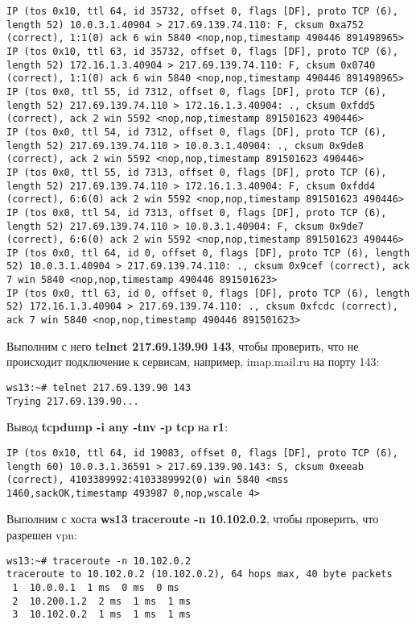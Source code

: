 \documentclass[a4paper,12pt]{article}
\begin{document}
\begin{Verbatim}
IP (tos 0x10, ttl 64, id 35732, offset 0, flags [DF], proto TCP (6), length 52) 10.0.3.1.40904 > 217.69.139.74.110: F, cksum 0xa752 (correct), 1:1(0) ack 6 win 5840 <nop,nop,timestamp 490446 891498965>
IP (tos 0x10, ttl 63, id 35732, offset 0, flags [DF], proto TCP (6), length 52) 172.16.1.3.40904 > 217.69.139.74.110: F, cksum 0x0740 (correct), 1:1(0) ack 6 win 5840 <nop,nop,timestamp 490446 891498965>
IP (tos 0x0, ttl 55, id 7312, offset 0, flags [DF], proto TCP (6), length 52) 217.69.139.74.110 > 172.16.1.3.40904: ., cksum 0xfdd5 (correct), ack 2 win 5592 <nop,nop,timestamp 891501623 490446>
IP (tos 0x0, ttl 54, id 7312, offset 0, flags [DF], proto TCP (6), length 52) 217.69.139.74.110 > 10.0.3.1.40904: ., cksum 0x9de8 (correct), ack 2 win 5592 <nop,nop,timestamp 891501623 490446>
IP (tos 0x0, ttl 55, id 7313, offset 0, flags [DF], proto TCP (6), length 52) 217.69.139.74.110 > 172.16.1.3.40904: F, cksum 0xfdd4 (correct), 6:6(0) ack 2 win 5592 <nop,nop,timestamp 891501623 490446>
IP (tos 0x0, ttl 54, id 7313, offset 0, flags [DF], proto TCP (6), length 52) 217.69.139.74.110 > 10.0.3.1.40904: F, cksum 0x9de7 (correct), 6:6(0) ack 2 win 5592 <nop,nop,timestamp 891501623 490446>
IP (tos 0x0, ttl 64, id 0, offset 0, flags [DF], proto TCP (6), length 52) 10.0.3.1.40904 > 217.69.139.74.110: ., cksum 0x9cef (correct), ack 7 win 5840 <nop,nop,timestamp 490446 891501623>
IP (tos 0x0, ttl 63, id 0, offset 0, flags [DF], proto TCP (6), length 52) 172.16.1.3.40904 > 217.69.139.74.110: ., cksum 0xfcdc (correct), ack 7 win 5840 <nop,nop,timestamp 490446 891501623>
\end{Verbatim}

Выполним с него \textbf{telnet 217.69.139.90 143},  чтобы проверить, что не
происходит подключение к сервисам, например, imap.mail.ru на порту 143:
\begin{Verbatim}
ws13:~# telnet 217.69.139.90 143
Trying 217.69.139.90...
\end{Verbatim}

Вывод \textbf{tcpdump -i any -tnv -p tcp} на \textbf{r1}:
\begin{Verbatim}
IP (tos 0x10, ttl 64, id 19083, offset 0, flags [DF], proto TCP (6), length 60) 10.0.3.1.36591 > 217.69.139.90.143: S, cksum 0xeeab (correct), 4103389992:4103389992(0) win 5840 <mss 1460,sackOK,timestamp 493987 0,nop,wscale 4>
\end{Verbatim}

Выполним с хоста \textbf{ws13} \textbf{traceroute -n 10.102.0.2},  чтобы проверить,
что разрешен vpn:
\begin{Verbatim}
ws13:~# traceroute -n 10.102.0.2
traceroute to 10.102.0.2 (10.102.0.2), 64 hops max, 40 byte packets
 1  10.0.0.1  1 ms  0 ms  0 ms
 2  10.200.1.2  2 ms  1 ms  1 ms
 3  10.102.0.2  1 ms  1 ms  1 ms
\end{Verbatim}
\end{document}
